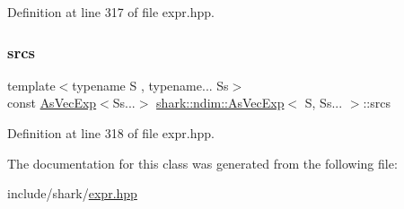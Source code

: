 Definition at line 317 of file expr.\+hpp.

\hypertarget{classshark_1_1ndim_1_1_as_vec_exp_3_01_s_00_01_ss_8_8_8_01_4_aed5717d0b843d3fbe4c99a13109fbb6b}{}\label{classshark_1_1ndim_1_1_as_vec_exp_3_01_s_00_01_ss_8_8_8_01_4_aed5717d0b843d3fbe4c99a13109fbb6b} 
\subsubsection{\texorpdfstring{srcs}{srcs}}
{\footnotesize\ttfamily template$<$typename S , typename... Ss$>$ \\
const \hyperlink{classshark_1_1ndim_1_1_as_vec_exp}{As\+Vec\+Exp}$<$Ss...$>$ \hyperlink{classshark_1_1ndim_1_1_as_vec_exp}{shark\+::ndim\+::\+As\+Vec\+Exp}$<$ S, Ss... $>$\+::srcs\hspace{0.3cm}{\ttfamily [private]}}



Definition at line 318 of file expr.\+hpp.



The documentation for this class was generated from the following file\+:\begin{DoxyCompactItemize}
\item 
include/shark/\hyperlink{expr_8hpp}{expr.\+hpp}\end{DoxyCompactItemize}
